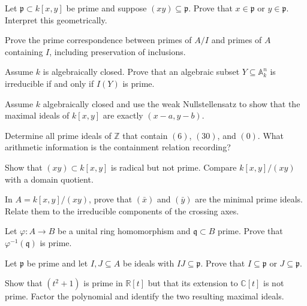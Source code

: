 \begin{exercise}\label{ex:vi06-xy-primes}
Let \(\mathfrak p\subset k[x,y]\) be prime and suppose \((xy)\subseteq\mathfrak p\).
Prove that \(x\in\mathfrak p\) or \(y\in\mathfrak p\).  Interpret this geometrically.
\end{exercise}

\begin{exercise}\label{ex:vi06-quotient-correspondence}
Prove the prime correspondence between primes of \(A/I\) and primes of \(A\) containing
\(I\), including preservation of inclusions.
\end{exercise}

\begin{exercise}\label{ex:vi06-irred-prime}
Assume \(k\) is algebraically closed.  Prove that an algebraic subset
\(Y\subseteq\mathbb A_k^n\) is irreducible if and only if \(I(Y)\) is prime.
\end{exercise}

\begin{exercise}\label{ex:vi06-maximal-points}
Assume \(k\) algebraically closed and use the weak Nullstellensatz to show that the maximal
ideals of \(k[x,y]\) are exactly \((x-a,y-b)\).
\end{exercise}

\begin{exercise}\label{ex:vi06-Z-six}
Determine all prime ideals of \(\mathbb Z\) that contain \((6)\), \((30)\), and \((0)\).
What arithmetic information is the containment relation recording?
\end{exercise}

\begin{exercise}\label{ex:vi06-radical-not-prime}
Show that \((xy)\subset k[x,y]\) is radical but not prime.  Compare
\(k[x,y]/(xy)\) with a domain quotient.
\end{exercise}

\begin{exercise}\label{ex:vi06-minimal-primes-cross}
In \(A=k[x,y]/(xy)\), prove that \((\bar x)\) and \((\bar y)\) are the minimal prime
ideals.  Relate them to the irreducible components of the crossing axes.
\end{exercise}

\begin{exercise}\label{ex:vi06-preimage-prime}
Let \(\varphi:A\to B\) be a unital ring homomorphism and \(\mathfrak q\subset B\) prime.
Prove that \(\varphi^{-1}(\mathfrak q)\) is prime.
\end{exercise}

\begin{exercise}\label{ex:vi06-products-ideals}
Let \(\mathfrak p\) be prime and let \(I,J\subseteq A\) be ideals with
\(IJ\subseteq\mathfrak p\).  Prove that \(I\subseteq\mathfrak p\) or
\(J\subseteq\mathfrak p\).
\end{exercise}

\begin{exercise}\label{ex:vi06-complex-splitting}
Show that \((t^2+1)\) is prime in \(\mathbb R[t]\) but that its extension to
\(\mathbb C[t]\) is not prime.  Factor the polynomial and identify the two resulting
maximal ideals.
\end{exercise}

